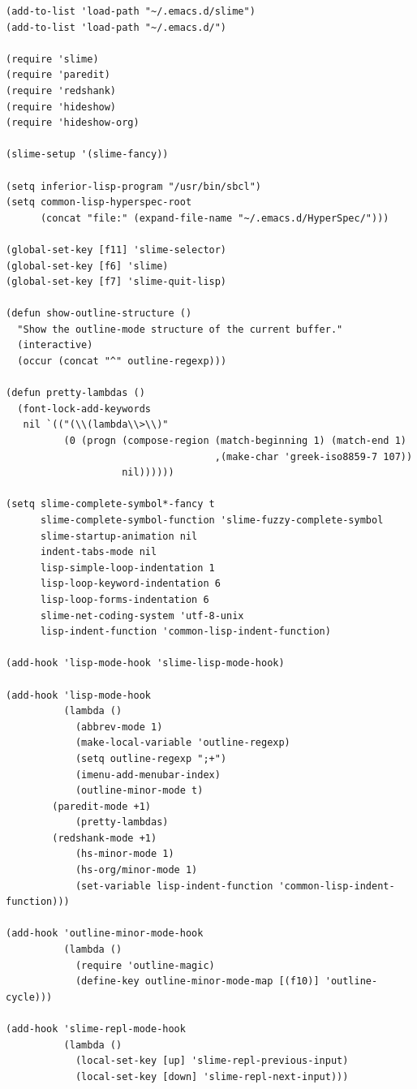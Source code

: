 \documentclass[12pt,brazil]{book}
\begin{document}
\begin{verbatim}
(add-to-list 'load-path "~/.emacs.d/slime")
(add-to-list 'load-path "~/.emacs.d/")

(require 'slime)
(require 'paredit)
(require 'redshank)
(require 'hideshow)
(require 'hideshow-org)

(slime-setup '(slime-fancy))

(setq inferior-lisp-program "/usr/bin/sbcl")
(setq common-lisp-hyperspec-root
      (concat "file:" (expand-file-name "~/.emacs.d/HyperSpec/")))

(global-set-key [f11] 'slime-selector)
(global-set-key [f6] 'slime)
(global-set-key [f7] 'slime-quit-lisp)

(defun show-outline-structure ()
  "Show the outline-mode structure of the current buffer."
  (interactive)
  (occur (concat "^" outline-regexp)))

(defun pretty-lambdas ()
  (font-lock-add-keywords
   nil `(("(\\(lambda\\>\\)"
          (0 (progn (compose-region (match-beginning 1) (match-end 1)
                                    ,(make-char 'greek-iso8859-7 107))
                    nil))))))

(setq slime-complete-symbol*-fancy t
      slime-complete-symbol-function 'slime-fuzzy-complete-symbol
      slime-startup-animation nil
      indent-tabs-mode nil
      lisp-simple-loop-indentation 1
      lisp-loop-keyword-indentation 6
      lisp-loop-forms-indentation 6
      slime-net-coding-system 'utf-8-unix
      lisp-indent-function 'common-lisp-indent-function)

(add-hook 'lisp-mode-hook 'slime-lisp-mode-hook)

(add-hook 'lisp-mode-hook
          (lambda ()
            (abbrev-mode 1)
            (make-local-variable 'outline-regexp)
            (setq outline-regexp ";+")
            (imenu-add-menubar-index)
            (outline-minor-mode t)
	    (paredit-mode +1)
            (pretty-lambdas)
	    (redshank-mode +1)
            (hs-minor-mode 1)
            (hs-org/minor-mode 1)
            (set-variable lisp-indent-function 'common-lisp-indent-function)))

(add-hook 'outline-minor-mode-hook 
          (lambda () 
            (require 'outline-magic)
            (define-key outline-minor-mode-map [(f10)] 'outline-cycle)))

(add-hook 'slime-repl-mode-hook
          (lambda ()
            (local-set-key [up] 'slime-repl-previous-input)
            (local-set-key [down] 'slime-repl-next-input)))


\end{verbatim}
\end{document}
